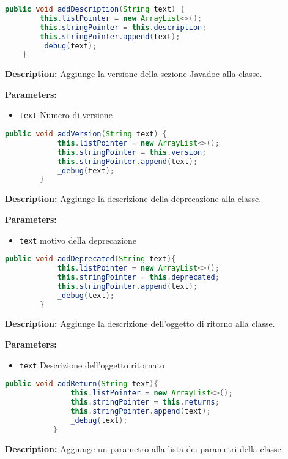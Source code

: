 \begin{lstlisting}[language=Java]
    public void addDescription(String text) {
        this.listPointer = new ArrayList<>();
        this.stringPointer = this.description;
        this.stringPointer.append(text);
        _debug(text);
    }
\end{lstlisting}
\textbf{Description:}  Aggiunge la versione della sezione Javadoc alla classe. 

\textbf{Parameters:}
\begin{itemize}
  \item\texttt{text} Numero di versione
\end{itemize}

\begin{lstlisting}[language=Java]
        public void addVersion(String text) {
            this.listPointer = new ArrayList<>();
            this.stringPointer = this.version;
            this.stringPointer.append(text);
            _debug(text);
        }
\end{lstlisting}
\textbf{Description:}  Aggiunge la descrizione della deprecazione alla classe. 

\textbf{Parameters:}
\begin{itemize}
  \item\texttt{text} motivo della deprecazione
\end{itemize}

\begin{lstlisting}[language=Java]
        public void addDeprecated(String text){
            this.listPointer = new ArrayList<>();
            this.stringPointer = this.deprecated;
            this.stringPointer.append(text);
            _debug(text);
        }
\end{lstlisting}
\textbf{Description:}  Aggiunge la descrizione dell'oggetto di ritorno alla classe. 

\textbf{Parameters:}
\begin{itemize}
  \item\texttt{text} Descrizione dell'oggetto ritornato
\end{itemize}

\begin{lstlisting}[language=Java]
           public void addReturn(String text){
               this.listPointer = new ArrayList<>();
               this.stringPointer = this.returns;
               this.stringPointer.append(text);
               _debug(text);
           }
\end{lstlisting}
\textbf{Description:}  Aggiunge un parametro alla lista dei parametri della classe. 

